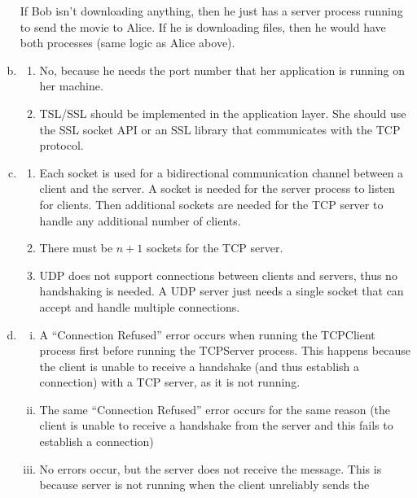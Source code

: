 \documentclass[11pt]{article}
\begin{document}
\begin{enumerate}[(a)]
      If Bob isn't downloading anything, then he just has a server process running
      to send the movie to Alice. If he is downloading files, then he would have both
      processes (same logic as Alice above).
    \item
      \begin{enumerate}
        \item
          No, because he needs the port number that her application is running
          on her machine.
        \item
          TSL/SSL should be implemented in the application layer. She should use
          the SSL socket API or an SSL library that communicates with the TCP protocol.
      \end{enumerate}
    \item
      \begin{enumerate}
        \item
          Each socket is used for a bidirectional communication channel between a
          client and the server. A socket is needed for the server process to
          listen for clients. Then additional sockets are needed for the TCP server
          to handle any additional number of clients.
        \item
          There must be $n+1$ sockets for the TCP server.
        \item
          UDP does not support connections between clients and servers, thus
          no handshaking is needed. A UDP server just needs a single socket
          that can accept and handle multiple connections.
      \end{enumerate}
    \item
      \begin{enumerate}[(i)]
        \item
          A ``Connection Refused'' error occurs when running the TCPClient process
          first before running the TCPServer process. This happens because the client
          is unable to receive a handshake (and thus establish a connection) with
          a TCP server, as it is not running.
        \item
          The same ``Connection Refused'' error occurs for the same reason (the
          client is unable to receive a handshake from the server and this fails
          to establish a connection)
        \item
          No errors occur, but the server does not receive the message. This is
          because server is not running when the client unreliably sends the

\end{enumerate}
\end{enumerate}
\end{document}
